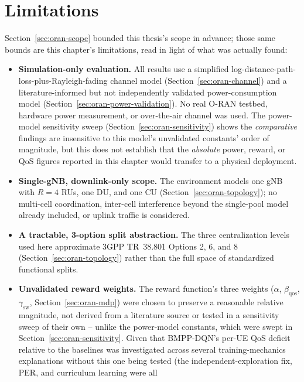 \section{Limitations}
\label{sec:oran-limitations}

Section~\ref{sec:oran-scope} bounded this thesis's scope in advance; those
same bounds are this chapter's limitations, read in light of what was
actually found:

\begin{itemize}
  \item \textbf{Simulation-only evaluation.} All results use a simplified
    log-distance-path-loss-plus-Rayleigh-fading channel model
    (Section~\ref{sec:oran-channel}) and a literature-informed but not
    independently validated power-consumption model
    (Section~\ref{sec:oran-power-validation}). No real O-RAN testbed,
    hardware power measurement, or over-the-air channel was used. The
    power-model sensitivity sweep (Section~\ref{sec:oran-sensitivity})
    shows the \emph{comparative} findings are insensitive to this model's
    unvalidated constants' order of magnitude, but this does not establish
    that the \emph{absolute} power, reward, or QoS figures reported in this
    chapter would transfer to a physical deployment.
  \item \textbf{Single-gNB, downlink-only scope.} The environment models one
    gNB with $R=4$ RUs, one DU, and one CU (Section~\ref{sec:oran-topology});
    no multi-cell coordination, inter-cell interference beyond the
    single-pool model already included, or uplink traffic is considered.
  \item \textbf{A tractable, 3-option split abstraction.} The three
    centralization levels used here approximate 3GPP TR~38.801 Options 2, 6,
    and 8 (Section~\ref{sec:oran-topology}) rather than the full space of
    standardized functional splits.
  \item \textbf{Unvalidated reward weights.} The reward function's three
    weights ($\alpha$, $\beta_{\mathrm{qos}}$, $\gamma_{\mathrm{sw}}$,
    Section~\ref{sec:oran-mdp}) were chosen to preserve a reasonable
    relative magnitude, not derived from a literature source or tested in a
    sensitivity sweep of their own -- unlike the power-model constants, which
    were swept in Section~\ref{sec:oran-sensitivity}. Given that BMPP-DQN's
    per-UE QoS deficit relative to the baselines was investigated across
    several training-mechanics explanations without this one being tested
    (the independent-exploration fix, PER, and curriculum learning were all

\end{itemize}
